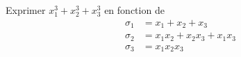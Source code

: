 Exprimer $x_1^3+x_2^3+x_3^3$ en fonction de 
\begin{align*}
 \sigma_1 &= x_1+x_2+x_3 \\
 \sigma_2 &= x_1x_2 + x_2x_3 + x_1x_3\\
 \sigma_3 &= x_1 x_2 x_3 
\end{align*}
\bigskip